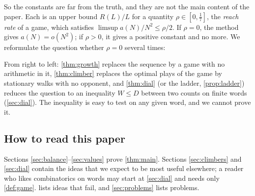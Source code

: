 \documentclass[11pt]{amsart}
\theoremstyle{definition}
\begin{document}
So the constants are far from the truth, and they are not the main content of the paper. Each is an upper bound $R(L)/L$ for a
quantity $\rho\in[0,\frac17]$, the \emph{reach rate} of a game, which satisfies $\limsup a(N)/N^2\le\rho/2$. If $\rho=0$, the
method gives $a(N)=o(N^2)$; if $\rho>0$, it gives a positive constant and no more. We reformulate the question whether $\rho=0$
several times:
\begin{center}
\end{center}
From right to left: \cref{thm:growth} replaces the sequence by a game with no arithmetic in it, \cref{thm:climber} replaces the
optimal plays of the game by stationary walks with no opponent, and \cref{thm:dial} (or the ladder, \cref{prop:ladder})
reduces the question to an inequality $W\le D$ between two counts on finite words (\cref{sec:dial}). The inequality is easy to test on any given word, and we cannot prove it.

\subsection{How to read this paper}
Sections \ref{sec:balance}--\ref{sec:values} prove \cref{thm:main}. Sections \ref{sec:climbers} and \ref{sec:dial} contain the ideas that we expect to be most useful elsewhere; a reader who likes combinatorics on words may start at
\cref{sec:dial} and needs only \cref{def:game}.  lists ideas that fail, and \cref{sec:problems} lists problems.
\end{document}
